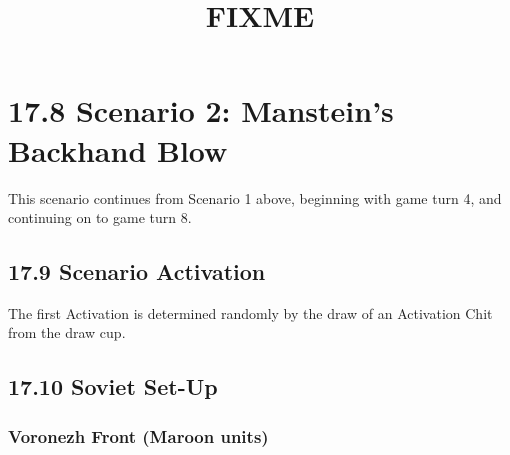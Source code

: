 \documentclass[10pt]{article}
\title{FIXME}
\begin{document}
\maketitle

\section*{17.8 Scenario 2: Manstein’s Backhand Blow}

This scenario continues from Scenario 1 above, beginning with game turn 4, and continuing on to game turn 8.

\subsection*{17.9 Scenario Activation}

The first Activation is determined randomly by the draw of an Activation Chit from the draw cup. 

\subsection*{17.10 Soviet Set-Up}

\subsubsection*{Voronezh Front (Maroon units)}
\end{document}
